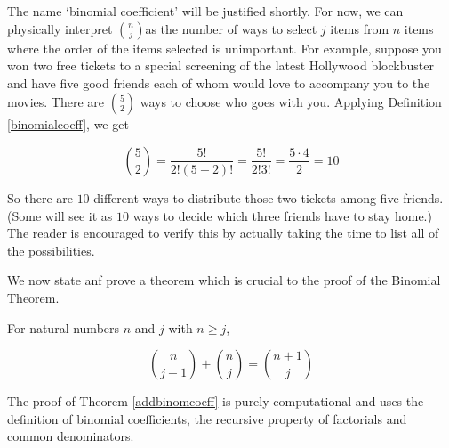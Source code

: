 \smallskip
 
The name `binomial coefficient' will be justified shortly.  For now, we can physically interpret $\binom{n}{j}$as the number of ways to select $j$ items from $n$ items where the order of the items selected is unimportant.   For example, suppose you won two free tickets to a special screening of the latest Hollywood blockbuster and have five good friends each of whom would love to accompany you to the movies.  There are $\binom{5}{2}$ ways to choose who goes with you.  Applying Definition \ref{binomialcoeff}, we get

\[ \binom{5}{2} = \dfrac{5!}{2! (5-2)!} = \dfrac{5!}{2! 3!} = \dfrac{5 \cdot 4}{2} = 10\] 

So there are $10$ different ways to distribute those two tickets among five friends. (Some will see it as $10$ ways to decide which three friends have to stay home.)  The reader is encouraged to verify this by actually taking the time to list all of the possibilities.  

\smallskip

We now state anf prove a theorem which is crucial to the proof of the Binomial Theorem.

\smallskip

\colorbox{ResultColor}{\bbm

\begin{thm}  \label{addbinomcoeff}  For natural numbers $n$ and $j$ with $n \geq j$, 

\[ \binom{n}{j-1} + \binom{n}{j} = \binom{n+1}{j} \]



\end{thm}

\ebm}

\smallskip

The proof of Theorem \ref{addbinomcoeff} is purely computational and uses the definition of binomial coefficients, the recursive property of factorials and common denominators.

